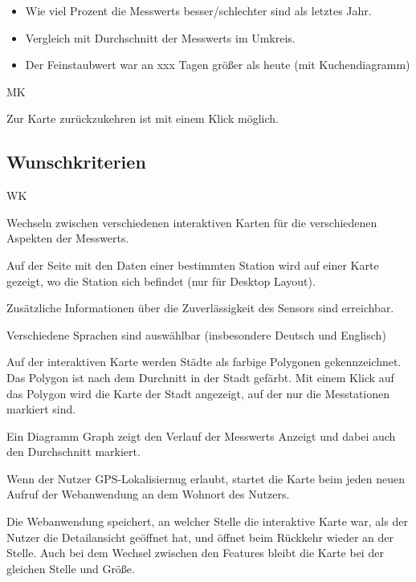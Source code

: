 \begin{itemize}
	\item Wie viel Prozent die \glspl{Messwert} besser/schlechter sind als letztes Jahr.
    \item Vergleich mit Durchschnitt der \glspl{Messwert} im Umkreis.
    \item Der Feinstaubwert war an xxx Tagen größer als heute (mit \gls{Kuchendiagramm})
\end{itemize}

\begin{Kriterien}{MK}	
	\item Zur Karte zurückzukehren ist mit einem Klick möglich.
\end{Kriterien}

\newpage
\subsection{Wunschkriterien}
\setcounter{counter}{10}
\begin{Kriterien}{WK}

	\item Wechseln zwischen verschiedenen interaktiven Karten für die verschiedenen Aspekten der \glspl{Messwert}.

	\item Auf der Seite mit den Daten einer bestimmten \gls{Station} wird auf einer Karte gezeigt, wo die \gls{Station} sich befindet (nur für Desktop Layout). 

	\item Zusätzliche Informationen über die Zuverlässigkeit des Sensors sind erreichbar.

	\item Verschiedene Sprachen sind auswählbar (insbesondere Deutsch und Englisch)
	
	\item Auf der interaktiven Karte werden Städte als farbige Polygonen gekennzeichnet. Das Polygon ist nach dem Durchnitt in der Stadt gefärbt. Mit einem Klick auf das Polygon wird die Karte der Stadt angezeigt, auf der nur die Messtationen markiert sind. 
	
	\item Ein Diagramm  \gls{Graph} zeigt den Verlauf der \glspl{Messwert} Anzeigt und dabei auch den Durchschnitt markiert.
	
	\item Wenn der Nutzer GPS-Lokalisiernug erlaubt, startet die Karte beim jeden neuen Aufruf der Webanwendung an dem Wohnort des Nutzers.
	
	\item Die Webanwendung speichert, an welcher Stelle die interaktive Karte war, als der Nutzer die Detailansicht geöffnet hat, und öffnet beim Rückkehr wieder an der Stelle. Auch bei dem Wechsel zwischen den Features bleibt die Karte bei der gleichen Stelle und Größe.

\end{Kriterien}


